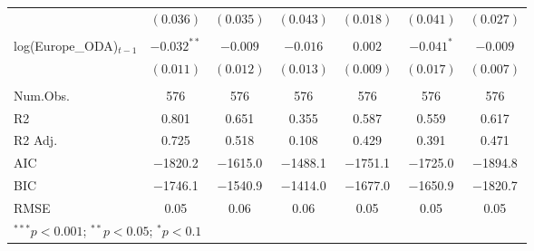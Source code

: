 \begin{longtable}{@{\extracolsep{-3pt}}lcccccc}
                          & $(0.036)$      & $(0.035)$      & $(0.043)$    & $(0.018)$      & $(0.041)$      & $(0.027)$     \\
                          &&&&&&\\
log(Europe\_ODA)$_{t-1}$ & $-0.032^{**}$  & $-0.009$       & $-0.016$     & $0.002$        & $-0.041^{*}$   & $-0.009$      \\
                          & $(0.011)$      & $(0.012)$      & $(0.013)$    & $(0.009)$      & $(0.017)$      & $(0.007)$     \\
\hline \\[-0.9ex]
Num.Obs. & \num{576} & \num{576} & \num{576} & \num{576} & \num{576} & \num{576}\\
R2 & \num{0.801} & \num{0.651} & \num{0.355} & \num{0.587} & \num{0.559} & \num{0.617}\\
R2 Adj. & \num{0.725} & \num{0.518} & \num{0.108} & \num{0.429} & \num{0.391} & \num{0.471}\\
AIC & \num{-1820.2} & \num{-1615.0} & \num{-1488.1} & \num{-1751.1} & \num{-1725.0} & \num{-1894.8}\\
BIC & \num{-1746.1} & \num{-1540.9} & \num{-1414.0} & \num{-1677.0} & \num{-1650.9} & \num{-1820.7}\\
RMSE & \num{0.05} & \num{0.06} & \num{0.06} & \num{0.05} & \num{0.05} & \num{0.05}\\
\bottomrule
\multicolumn{7}{l}{\scriptsize{$^{***}p<0.001$; $^{**}p<0.05$; $^{*}p<0.1$}}
\label{table:FE_RQ2}
\end{longtable}
